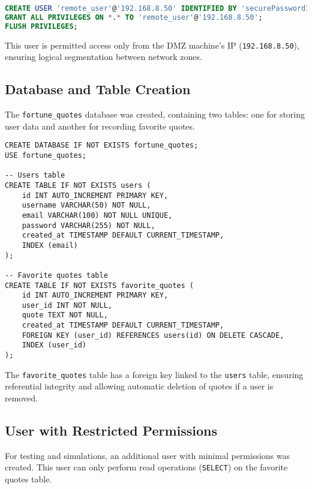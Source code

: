 \documentclass[12pt]{report}
\begin{document}
\begin{lstlisting}[language=sql, caption={Creation of remote user with privileges}]
CREATE USER 'remote_user'@'192.168.8.50' IDENTIFIED BY 'securePassword123';
GRANT ALL PRIVILEGES ON *.* TO 'remote_user'@'192.168.8.50';
FLUSH PRIVILEGES;
\end{lstlisting}

This user is permitted access only from the DMZ machine's IP (\texttt{192.168.8.50}), ensuring logical segmentation between network zones.

\subsection*{Database and Table Creation}

The \texttt{fortune\_quotes} database was created, containing two tables: one for storing user data and another for recording favorite quotes.

\begin{lstlisting}[caption={Database and Table Creation}]
CREATE DATABASE IF NOT EXISTS fortune_quotes;
USE fortune_quotes;

-- Users table
CREATE TABLE IF NOT EXISTS users (
    id INT AUTO_INCREMENT PRIMARY KEY,
    username VARCHAR(50) NOT NULL,
    email VARCHAR(100) NOT NULL UNIQUE,
    password VARCHAR(255) NOT NULL,
    created_at TIMESTAMP DEFAULT CURRENT_TIMESTAMP,
    INDEX (email)
);

-- Favorite quotes table
CREATE TABLE IF NOT EXISTS favorite_quotes (
    id INT AUTO_INCREMENT PRIMARY KEY,
    user_id INT NOT NULL,
    quote TEXT NOT NULL,
    created_at TIMESTAMP DEFAULT CURRENT_TIMESTAMP,
    FOREIGN KEY (user_id) REFERENCES users(id) ON DELETE CASCADE,
    INDEX (user_id)
);
\end{lstlisting}

The \texttt{favorite\_quotes} table has a foreign key linked to the \texttt{users} table, ensuring referential integrity and allowing automatic deletion of quotes if a user is removed.

\subsection*{User with Restricted Permissions}

For testing and simulations, an additional user with minimal permissions was created. This user can only perform read operations (\texttt{SELECT}) on the favorite quotes table.
\end{document}
